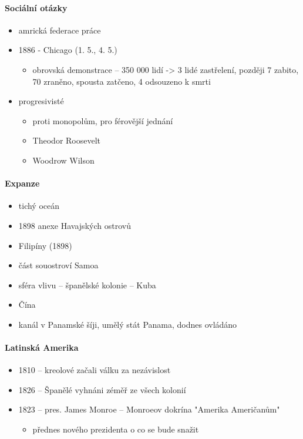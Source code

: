 \paragraph{Sociální otázky}
\begin{itemize}
\item amrická federace práce
\item 1886 - Chicago (1. 5., 4. 5.)
	\begin{itemize}
	\item obrovská demonstrace -- 350 000 lidí -> 3 lidé zastřelení, později 7 zabito, 70 zraněno, spousta zatčeno, 4 odsouzeno k smrti
	\end{itemize}
\item progresivisté
	\begin{itemize}
	\item proti monopolům, pro férovější jednání
	\item Theodor Roosevelt
	\item Woodrow Wilson
	\end{itemize}
\end{itemize}

\paragraph{Expanze}
\begin{itemize}
\item tichý oceán
\item 1898 anexe Havajských ostrovů
\item Filipíny (1898)
\item část souostroví Samoa
\item sféra vlivu -- španělské kolonie -- Kuba
\item Čína
\item kanál v Panamské šíji, umělý stát Panama, dodnes ovládáno
\end{itemize}

\paragraph{Latinská Amerika}
\begin{itemize}
\item 1810 -- kreolové začali válku za nezávislost
\item 1826 -- Španělé vyhnáni zéměř ze všech kolonií
\item 1823 -- pres. James Monroe -- Monroeov dokrína "Amerika Američanům"
	\begin{itemize}
	\item přednes nového prezidenta o co se bude snažit
	\end{itemize}
\end{itemize}

